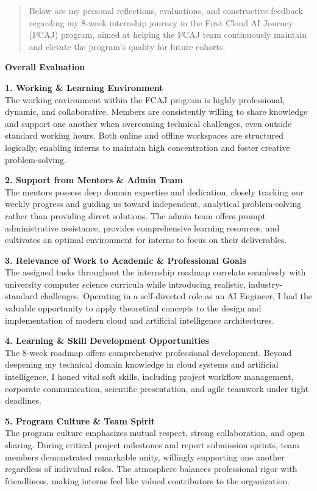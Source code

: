 \begin{quote}
Below are my personal reflections, evaluations, and constructive
feedback regarding my 8-week internship journey in the First Cloud AI
Journey (FCAJ) program, aimed at helping the FCAJ team continuously
maintain and elevate the program's quality for future cohorts.
\end{quote}

\vspace{0.5em}\noindent\textbf{Overall Evaluation}

\textbf{1. Working \& Learning Environment}\\
The working environment within the FCAJ program is highly professional,
dynamic, and collaborative. Members are consistently willing to share
knowledge and support one another when overcoming technical challenges,
even outside standard working hours. Both online and offline workspaces
are structured logically, enabling interns to maintain high
concentration and foster creative problem-solving.

\textbf{2. Support from Mentors \& Admin Team}\\
The mentors possess deep domain expertise and dedication, closely
tracking our weekly progress and guiding us toward independent,
analytical problem-solving rather than providing direct solutions. The
admin team offers prompt administrative assistance, provides
comprehensive learning resources, and cultivates an optimal environment
for interns to focus on their deliverables.

\textbf{3. Relevance of Work to Academic \& Professional Goals}\\
The assigned tasks throughout the internship roadmap correlate
seamlessly with university computer science curricula while introducing
realistic, industry-standard challenges. Operating in a self-directed
role as an AI Engineer, I had the valuable opportunity to apply
theoretical concepts to the design and implementation of modern cloud
and artificial intelligence architectures.

\textbf{4. Learning \& Skill Development Opportunities}\\
The 8-week roadmap offers comprehensive professional development. Beyond
deepening my technical domain knowledge in cloud systems and artificial
intelligence, I honed vital soft skills, including project workflow
management, corporate communication, scientific presentation, and agile
teamwork under tight deadlines.

\textbf{5. Program Culture \& Team Spirit}\\
The program culture emphasizes mutual respect, strong collaboration, and
open sharing. During critical project milestones and report submission
sprints, team members demonstrated remarkable unity, willingly
supporting one another regardless of individual roles. The atmosphere
balances professional rigor with friendliness, making interns feel like
valued contributors to the organization.

